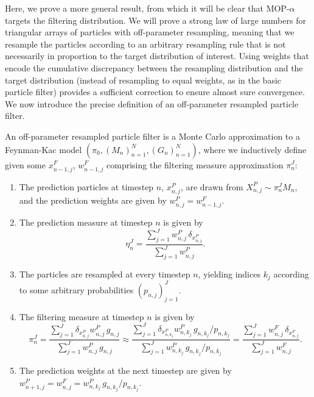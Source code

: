 

Here, we prove a more general result, from which it will be clear that MOP-$\alpha$ targets the filtering distribution. 
We will prove a strong law of large numbers for triangular arrays of particles with off-parameter resampling, meaning that we resample the particles according to an arbitrary resampling rule that is not necessarily in proportion to the target distribution of interest. 
Using weights that encode the cumulative discrepancy between the resampling distribution and the target distribution (instead of resampling to equal weights, as in the basic particle filter) provides a sufficient correction to ensure almost sure convergence.
We now introduce the precise definition of an off-parameter resampled particle filter. 

\begin{defn}
    \label{defn:off-parameter-filter}
    An off-parameter resampled particle filter is a Monte Carlo approximation to a Feynman-Kac model $\left(\pi_0,\left(M_n\right)_{n=1}^N,\left(G_n\right)_{n=1}^N\right)$, where we inductively define given some $x_{n-1,j}^F$, $w_{n-1,j}^F$ comprising the filtering measure approximation $\pi_n^J$:
    \begin{enumerate}
        \item The prediction particles at timestep $n$, $x_{n,j}^P$, are drawn from $X_{n,j}^P \sim \pi_n^J M_n$, and the prediction weights are given by $w_{n,j}^P = w_{n-1,j}^F$. 
        \item The prediction measure at timestep $n$ is given by 
        \begin{equation}
        \eta_n^J = \frac{\sum_{j=1}^J w_{n,j}^P \, \delta_{x_{n,j}^P}}{\sum_{j=1}^J w_{n,j}^P}.
        \end{equation}
        \item The particles are resampled at every timestep $n$, yielding indices $k_j$ according to some arbitrary probabilities $(p_{n,j})_{j=1}^J$.
        \item The filtering measure at timestep $n$ is given by
        \begin{equation}
        \pi_n^J = \frac{\sum_{j=1}^J \delta_{x_{n,j}^P } w_{n,j}^P \, g_{n,j}}{\sum_{j=1}^J w_{n,j}^P \, g_{n,j}} \approx \frac{\sum_{j=1}^J \delta_{x_{n,k_j}^P }w_{n,k_j}^P \, g_{n,k_j}\big/p_{n,k_j}}{\sum_{j=1}^J w_{n,k_j}^P\, g_{n,k_j}\big/p_{n,k_j}} = \frac{\sum_{j=1}^J w_{n,j}^F \, \delta_{x_{n,j}^F}}{\sum_{j=1}^J w_{n,j}^F}.
        \end{equation}
        \item The prediction weights at the next timestep are given by $w_{n+1,j}^P = w_{n,j}^F =  w_{n,k_j}^P \, g_{n,k_j}\big/p_{n,k_j}$.
    \end{enumerate}
\end{defn}


